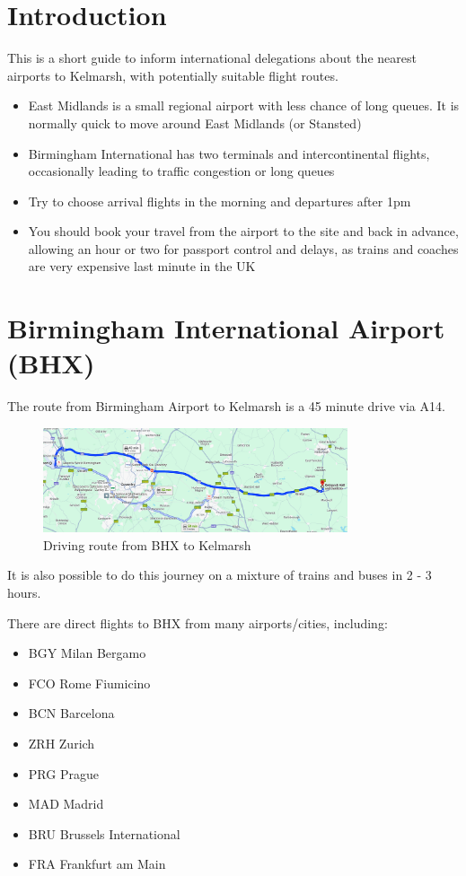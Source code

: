\documentclass[a4paper, 11pt]{article}
\begin{document}
\makedocumenttitlepage

\section{Introduction}
This is a short guide to inform international delegations about the nearest airports to Kelmarsh, with potentially suitable flight routes.
\begin{itemize}
    \item East Midlands is a small regional airport with less chance of long queues. It is normally quick to move around East Midlands (or Stansted) 
    \item Birmingham International has two terminals and intercontinental flights, occasionally leading to traffic congestion or long queues
    \item Try to choose arrival flights in the morning and departures after 1pm
    \item You should book your travel from the airport to the site and back in advance, allowing an hour or two for passport control and delays, as trains and coaches are very expensive last minute in the UK
\end{itemize}

\section{Birmingham International Airport (BHX)}
The route from Birmingham Airport to Kelmarsh is a 45 minute drive via A14.

\begin{figure}[H]
    \centering
    \includegraphics[width=0.8\textwidth]{assets/bhx.png}
    \caption{Driving route from BHX to Kelmarsh}
\end{figure}

It is also possible to do this journey on a mixture of trains and buses in 2 - 3 hours.

There are direct flights to BHX from many airports/cities, including:
\begin{multicols}{2}
    \begin{itemize}
        \item BGY Milan Bergamo
        \item FCO Rome Fiumicino
        \item BCN Barcelona
        \item ZRH Zurich 
        \item PRG Prague
        \item MAD Madrid
        \item BRU Brussels International
        \item FRA Frankfurt am Main
    \end{itemize}
\end{multicols}
\end{document}
